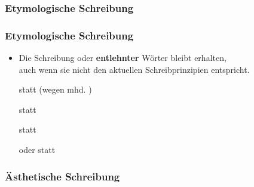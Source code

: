 \subsubsection{Etymologische Schreibung}

\begin{frame}
\frametitle{Etymologische Schreibung}

\begin{itemize}
	\item Die Schreibung  oder \textbf{entlehnter} Wörter bleibt erhalten,\\
	auch wenn sie nicht den aktuellen Schreibprinzipien entspricht.
	
	\eal
		\ex {} statt  (wegen mhd. )
		
		\ex {} statt 
		
		\ex {} statt 
		
		\ex {} oder  statt 
	\zl

\end{itemize}

\end{frame}


\subsubsection{Ästhetische Schreibung}

